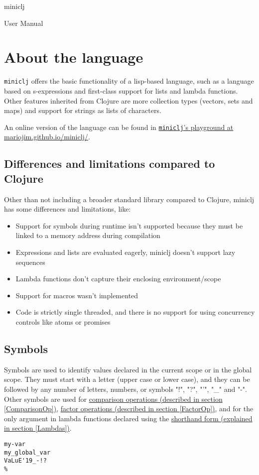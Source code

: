\documentclass[11pt]{scrreprt}
\begin{document}
{\centering
{\huge
miniclj\par}
{\LARGE
User Manual\par}}

\tableofcontents

\chapter{About the language}
\texttt{miniclj} offers the basic functionality of a lisp-based language, such as a language based on s-expressions and first-class support for lists and lambda functions. Other features inherited from Clojure are more collection types (vectors, sets and maps) and support for strings as lists of characters.

An online version of the language can be found in \href{https://mariojim.github.io/miniclj/}{\texttt{miniclj}'s playground at mariojim.github.io/miniclj/}.

\section{Differences and limitations compared to Clojure}
Other than not including a broader standard library compared to Clojure, miniclj has some differences and limitations, like:
\begin{itemize}
    \item Support for symbols during runtime isn't supported because they must be linked to a memory address during compilation
    \item Expressions and lists are evaluated eagerly, miniclj doesn't support lazy sequences
    \item Lambda functions don't capture their enclosing environment/scope
    \item Support for macros wasn't implemented
    \item Code is strictly single threaded, and there is no support for using concurrency controls like atoms or promises
\end{itemize}

\section{Symbols}
Symbols are used to identify values declared in the current scope or in the global scope. They must start with a letter (upper case or lower case), and they can be followed by any number of letters, numbers, or symbols "!", "?", "'", "\_" and "-". Other symbols are used for \hyperref[ComparisonOp]{comparison operations (described in section \ref{ComparisonOp})}, \hyperref[FactorOp]{factor operations (described in section \ref{FactorOp})}, and for the only argument in lambda functions declared using the \hyperref[Lambdas]{shorthand form (explained in section \ref{Lambdas})}.
\begin{verbatim}
my-var
my_global_var
VaLuE'19_-!?
%
\end{verbatim}
\end{document}
